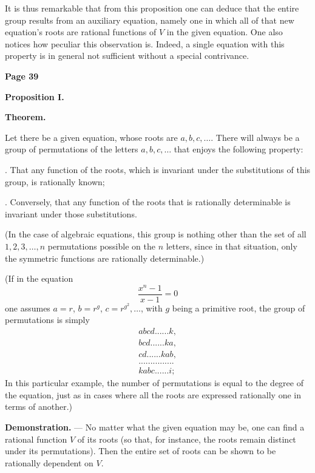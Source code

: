 \documentclass{article}
\begin{document}
\smallskip

\noindent
It is thus remarkable that from this proposition one can deduce that the entire group results from an auxiliary equation, namely one in which all of that new equation's roots are rational functions of \(V\) in the given equation. One also notices how peculiar this observation is. Indeed, a single equation with this property is in general not sufficient without a special contrivance.


\newpage
\noindent
\centerline{\textbf{Page 39}}

\noindent
\textbf{Proposition I.}

\smallskip


\noindent
\textbf{Theorem.} {Let there be a given equation, whose roots are \(a, b, c, \dots\). There will always be a group of permutations of the letters \(a, b, c, \dots\) that enjoys the following property:

\smallskip

. That any function of the roots, which is invariant under the substitutions of this group, is rationally known;

. Conversely, that any function of the roots that is rationally determinable is invariant under those substitutions.}

\smallskip

\noindent
(In the case of algebraic equations, this group is nothing other than the set of all \(1, 2, 3, \dots, n\) permutations possible on the \(n\) letters, since in that situation, only the symmetric functions are rationally determinable.)

\smallskip

\noindent
(If in the equation
\[
\frac{x^n - 1}{x - 1} = 0
\]
one assumes \(a = r\), \(b = r^g\), \(c = r^{g^2}, \dots\), with \(g\) being a primitive root, the group of permutations is simply
\[
\begin{matrix}
abcd......k,\\
bcd......ka,\\
cd......kab,\\
...............\\
kabc......i;
\end{matrix}
\]
In this particular example, the number of permutations is equal to the degree of the equation, just as in cases where all the roots are expressed rationally one in terms of another.)

\medskip

\noindent
\textbf{Demonstration.} --- No matter what the given equation may be, one can find a rational function \(V\) of its roots (so that, for instance, the roots remain distinct under its permutations). Then the entire set of roots can be shown to be rationally dependent on \(V\).
\end{document}
